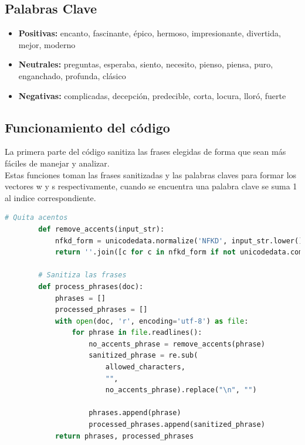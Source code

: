 \documentclass{article}
\begin{document}
    \subsection{Palabras Clave}
    \begin{itemize}
        \item \textbf{Positivas:} encanto, fascinante, épico, hermoso, impresionante, divertida, mejor, moderno
        \item \textbf{Neutrales:}  preguntas, esperaba, siento, necesito, pienso, piensa, puro, enganchado, profunda, clásico
        \item \textbf{Negativas:} complicadas, decepción, predecible, corta, locura, lloró, fuerte

    \end{itemize}

    \subsection{Funcionamiento del código}

    La primera parte del código sanitiza las frases elegidas de forma que sean más fáciles de manejar y analizar.\\
    Estas funciones toman las frases sanitizadas y las palabras claves para formar los vectores w y s respectivamente, cuando se encuentra una palabra clave se suma 1 al indice correspondiente.

    \begin{lstlisting}[language=Python]
        # Quita acentos
        def remove_accents(input_str):
            nfkd_form = unicodedata.normalize('NFKD', input_str.lower())
            return ''.join([c for c in nfkd_form if not unicodedata.combining(c)])

        # Sanitiza las frases
        def process_phrases(doc):
            phrases = []
            processed_phrases = []
            with open(doc, 'r', encoding='utf-8') as file:
                for phrase in file.readlines():
                    no_accents_phrase = remove_accents(phrase)
                    sanitized_phrase = re.sub(
                        allowed_characters,
                        "",
                        no_accents_phrase).replace("\n", "")

                    phrases.append(phrase)
                    processed_phrases.append(sanitized_phrase)
            return phrases, processed_phrases

    \end{lstlisting}
\end{document}
